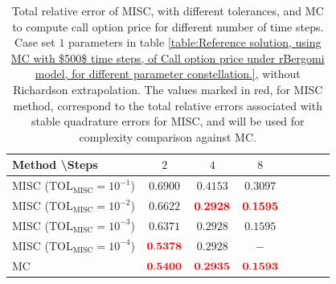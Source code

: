 \FloatBarrier
\begin{table}[h!]
	\centering
	\begin{tabular}{l*{6}{c}r}
		Method \textbackslash  Steps            & $2$ & $4$ & $8$   \\
		\hline
		MISC ($\text{TOL}_{\text{MISC}}=10^{-1}$)  & $\mathbf{
			0.6900}$& $\mathbf{    
			0.4153}$ & $\mathbf{     
			0.3097
		}$   \\
		MISC ($\text{TOL}_{\text{MISC}}=10^{-2}$)  & $\mathbf{ 
			0.6622}$ & $\mathbf{  {\color{red} 
				0.2928
			}
		}$ & $\mathbf{ {\color{red}    0.1595}}$   \\
		MISC ($\text{TOL}_{\text{MISC}}=10^{-3}$)        & $\mathbf{
			0.6371}$  &  $\mathbf{
			0.2928
		}$ &  $\mathbf{    0.1595}$ \\
		MISC ($\text{TOL}_{\text{MISC}}=10^{-4}$)        & $\mathbf{       {\color{red}0.5378}}$  & $\mathbf{
			0.2928
		}$  &  $-$ \\
		\hline
		MC    & $\mathbf{{\color{red}    0.5400}}$  & $\mathbf{{\color{red}0.2935}
		}$  &$\mathbf{{\color{red}
				0.1593}}$  \\	
		
		\hline
	\end{tabular}
	\caption{Total relative error of MISC, with different tolerances, and MC to compute call option price  for different number of time steps. Case  set $1$ parameters in table \ref{table:Reference solution, using MC with $500$ time steps, of Call option price under rBergomi model, for different parameter constellation.}, without Richardson extrapolation. The values marked in red, for MISC method, correspond to the total relative errors associated with  stable quadrature errors for MISC, and will be used for complexity comparison against MC.}
	\label{Total error of MISC and MC to compute Call option price of the different tolerances for different number of time steps. Case $K=1$, $H=0.07$, without Richardson extrapolation. The numbers between parentheses are the corresponding absolute errors,linear}
\end{table}
\FloatBarrier

